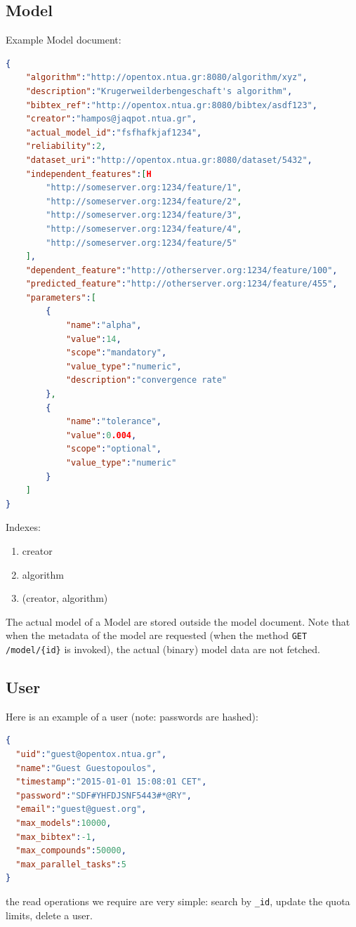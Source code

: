 \subsection{Model}
Example Model document:
\begin{lstlisting}[language=json]
{
    "algorithm":"http://opentox.ntua.gr:8080/algorithm/xyz",
    "description":"Krugerweilderbengeschaft's algorithm",
    "bibtex_ref":"http://opentox.ntua.gr:8080/bibtex/asdf123",
    "creator":"hampos@jaqpot.ntua.gr",
    "actual_model_id":"fsfhafkjaf1234",
    "reliability":2,
    "dataset_uri":"http://opentox.ntua.gr:8080/dataset/5432",
    "independent_features":[H
        "http://someserver.org:1234/feature/1",
        "http://someserver.org:1234/feature/2",
        "http://someserver.org:1234/feature/3",
        "http://someserver.org:1234/feature/4",
        "http://someserver.org:1234/feature/5"
    ],
    "dependent_feature":"http://otherserver.org:1234/feature/100",
    "predicted_feature":"http://otherserver.org:1234/feature/455",
    "parameters":[
        {
            "name":"alpha",
            "value":14,
            "scope":"mandatory",
            "value_type":"numeric",
            "description":"convergence rate"
        },
        {
            "name":"tolerance",
            "value":0.004,
            "scope":"optional",
            "value_type":"numeric"
        }
    ]
}
\end{lstlisting}

\noindent Indexes:
\begin{enumerate}
 \item creator
\item algorithm
\item (creator, algorithm)
\end{enumerate}

The actual model of a Model are stored outside the model document.  
Note that when the metadata of the model are requested (when the method 
\texttt{GET /model/\{id\}} is invoked), the actual (binary) model 
data are not fetched.


\subsection{User}
Here is an example of a user (note: passwords are hashed):
\begin{lstlisting}[language=json]
{ 
  "uid":"guest@opentox.ntua.gr", 
  "name":"Guest Guestopoulos", 
  "timestamp":"2015-01-01 15:08:01 CET", 
  "password":"SDF#YHFDJSNF5443#*@RY", 
  "email":"guest@guest.org", 
  "max_models":10000, 
  "max_bibtex":-1, 
  "max_compounds":50000, 
  "max_parallel_tasks":5 
} 
\end{lstlisting}
the read operations we require are very simple: search by \texttt{\_id}, 
update the quota limits, delete a user.

